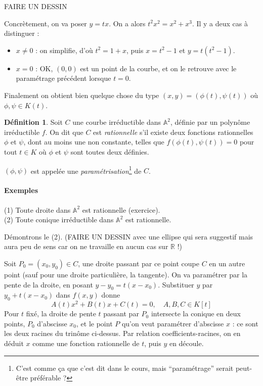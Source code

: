 \documentclass[a4paper, 11pt]{article}
\theoremstyle{definition}
\newtheorem{définition}{Définition}
\newcommand{\real}{\mathbb{R}}
\newcommand{\aff}{\mathbb{A}}
\begin{document}
FAIRE UN DESSIN

Concrètement, on va poser $y = tx$. On a alors $t^2 x^2 = x^2 +
x^3$. Il y a deux cas à distinguer :
\begin{itemize}
\item $x \neq 0$ : on simplifie, d'où $t^2 = 1 + x$, puis
  $x = t^2 - 1$ et $y = t(t^2 - 1)$.
\item $x=0$ : OK, $(0,0)$ est un point de la courbe, et on le retrouve
  avec le paramétrage précédent lorsque $t=0$.
\end{itemize}
Finalement on obtient bien quelque chose du type
$(x,y) = (\phi(t), \psi(t))$ où $\phi, \psi \in K(t)$.

\begin{définition}
  Soit $C$ une courbe irréductible dans $\aff^2$, définie par un
  polynôme irréductible $f$. On dit que $C$ est \emph{rationnelle}
  s'il existe deux fonctions rationnelles $\phi$ et $\psi$, dont au
  moins une non constante, telles que $f(\phi(t),\psi(t)) = 0$ pour
  tout $t \in K$ où $\phi$ et $\psi$ sont toutes deux définies.
  
  $(\phi, \psi)$ est appelée une \emph{paramétrisation}\footnote{C'est
    comme ça que c'est dit dans le cours, mais \enquote{paramétrage}
    serait peut-être préférable ?} de $C$.
\end{définition}

\paragraph{Exemples} (1) Toute droite dans $\aff^2$ est rationnelle (exercice).\\
(2) Toute conique irréductible dans $\aff^2$ est rationnelle.

Démontrons le (2). (FAIRE UN DESSIN avec une ellipse qui sera
suggestif mais aura peu de sens car on ne travaille en aucun cas sur
$\real$ !)

Soit $P_0 = (x_0, y_0) \in C$, une droite passant par ce point coupe $C$ en
un autre point (sauf pour une droite particulière, la tangente). On va
paramétrer par la pente de la droite, en posant $y-y_0 =
t(x-x_0)$. Substituer $y$ par $y_0 + t(x-x_0)$ dans $f(x,y)$ donne
\[ A(t)x^2 + B(t)x + C(t) = 0, \quad A,B,C \in K[t] \]
Pour $t$ fixé, la droite de pente $t$ passant par $P_0$ intersecte la
conique en deux points, $P_0$ d'abscisse $x_0$, et le point $P$ qu'on
veut paramétrer d'abscisse $x$ : ce sont les deux racines du trinôme
ci-dessus. Par relation coefficients-racines, on en déduit $x$ comme
une fonction rationnelle de $t$, puis $y$ en découle.
\end{document}

